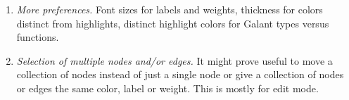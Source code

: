 \begin{enumerate}
\item \emph{More preferences.} Font sizes for labels and weights, thickness for colors
  distinct from highlights, distinct highlight colors for Galant types versus functions.

\item \emph{Selection of multiple nodes and/or edges.}  It might prove useful
  to move a collection of nodes instead of just a single node or give a
  collection of nodes or edges the same color, label or weight. This is
  mostly for edit mode.
\end{enumerate}


